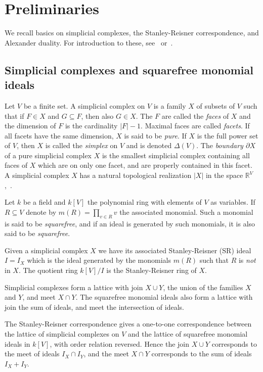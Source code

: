 \documentclass[10pt,a4paper]{article}
\theoremstyle{definition}
\theoremstyle{remark}
\theoremstyle{plain}
\newcommand{\pd}{\partial}
\newcommand{\sus}{\subseteq}
\begin{document}
\setcounter{section}{1}\setcounter{subsection}{0}

\section{Preliminaries}
\label{sec:pre}
We recall basics on simplicial complexes,
the Stanley-Reisner correspondence, and Alexander duality.
For introduction to these, see~\cite{HeHi, MiSt} or~\cite[Sec.II.5]{BH93}.

\subsection{Simplicial complexes and squarefree monomial ideals}
Let $V$ be a finite set. A simplicial complex on $V$ is
a family $X$ of subsets of $V$ such that if $F \in X$
and $G \sus F$, then also $G \in X$. The $F$ are called the
{\it faces} of $X$ and the dimension of $F$ is the cardinality $|F| -1$.
Maximal faces are called {\it facets}. If all facets have the same
dimension, $X$ is said to be {\it pure}.
If $X$ is the full power set of $V$, then
$X$ is called the {\it simplex} on $V$ and is denoted $\Delta(V)$. 
The {\it boundary $\pd X$} of a pure
simplicial complex $X$ is the smallest simplicial
complex containing all faces of $X$ which are on only one facet, and
are properly contained in this facet.
A simplicial complex $X$ has a natural topological realization $|X|$ in the
space ${\mathbb R}^V$,~\cite{Mun}.

Let $k$ be a field and $k[V]$ the polynomial ring with elements of $V$
as variables. If $R \sus V$ denote by $m(R) = \prod_{v \in R} v$ the
associated monomial. Such a monomial is said to be {\it squarefree},
and if an ideal is generated by such monomials, it is also said to be
{\it squarefree}.



Given a simplicial complex $X$ we have its associated Stanley-Reisner (SR)
ideal $I= I_X$ which is the ideal generated by the monomials
$m(R)$ such that $R$ is {\it not} in $X$. The quotient ring $k[V]/I$ is
the Stanley-Reisner ring of $X$.

Simplicial complexes form a lattice with join $X \cup Y$, the union
of the families $X$ and $Y$, and meet $X \cap Y$.
The squarefree monomial ideals also form a lattice
with join the sum of ideals, and meet the intersection of ideals.

The Stanley-Reisner correspondence gives
a one-to-one correspondence between the lattice of
simplicial complexes on $V$
and the lattice of squarefree monomial ideals in $k[V]$, with order relation
reversed. Hence the join $X \cup Y$ corresponds to the meet of ideals
$I_X \cap I_Y$, and the meet $X \cap Y$ corresponds to the sum of ideals
$I_X + I_Y$. 
\end{document}
